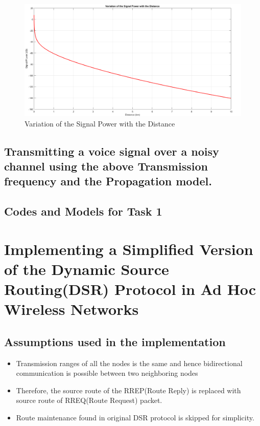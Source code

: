 \documentclass[a4paper,11pt]{article}%
\begin{document}
\begin{figure}[!h]
	\centering
	\includegraphics[scale=0.35]{figures/sp}
	\caption{Variation of the Signal Power with the Distance}
\end{figure}
\pagebreak

\subsection{Transmitting a voice signal over a noisy channel using the above Transmission frequency and the Propagation model.}

\pagebreak
\subsection{Codes and Models for Task 1}



\vfill



\section{Implementing a Simplified Version of the Dynamic Source Routing(DSR) Protocol in Ad Hoc Wireless Networks}
\subsection{Assumptions used in the implementation}
\begin{itemize}
	\item Transmission ranges of all the nodes is the same and hence bidirectional communication is possible between two neighboring nodes
	\item Therefore, the source route of the RREP(Route Reply) is replaced with source route of RREQ(Route Request) packet.
	\item Route maintenance found in original DSR protocol is skipped for simplicity.
\end{itemize}
\end{document}

